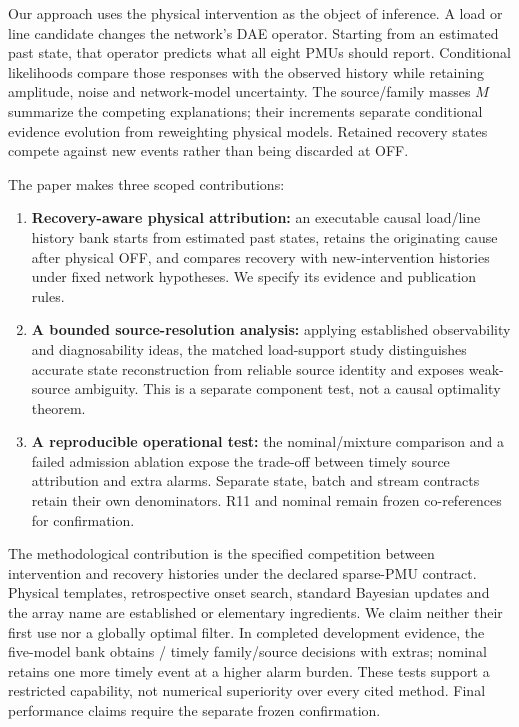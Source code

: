 Our approach uses the physical intervention as the object of inference. A load or line candidate changes the network's DAE operator. Starting from an estimated past state, that operator predicts what all eight PMUs should report. Conditional likelihoods compare those responses with the observed history while retaining amplitude, noise and network-model uncertainty. The source/family masses $M$ summarize the competing explanations; their increments separate conditional evidence evolution from reweighting physical models. Retained recovery states compete against new events rather than being discarded at OFF.

The paper makes three scoped contributions:
\begin{enumerate}
\item \textbf{Recovery-aware physical attribution:} an executable causal load/line history bank starts from estimated past states, retains the originating cause after physical OFF, and compares recovery with new-intervention histories under fixed network hypotheses. We specify its evidence and publication rules.
\item \textbf{A bounded source-resolution analysis:} applying established observability and diagnosability ideas, the matched load-support study distinguishes accurate state reconstruction from reliable source identity and exposes weak-source ambiguity. This is a separate component test, not a causal optimality theorem.
\item \textbf{A reproducible operational test:} the nominal/mixture comparison and a failed admission ablation expose the trade-off between timely source attribution and extra alarms. Separate state, batch and stream contracts retain their own denominators. R11 and nominal remain frozen co-references for confirmation.
\end{enumerate}

The methodological contribution is the specified competition between intervention and recovery histories under the declared sparse-PMU contract. Physical templates, retrospective onset search, standard Bayesian updates and the array name are established or elementary ingredients. We claim neither their first use nor a globally optimal filter. In completed development evidence, the five-model bank obtains \ContMixTimely{}/\ContMixTotal{} timely family/source decisions with \ContMixExtras{} extras; nominal retains one more timely event at a higher alarm burden. These tests support a restricted capability, not numerical superiority over every cited method. Final performance claims require the separate frozen confirmation.


